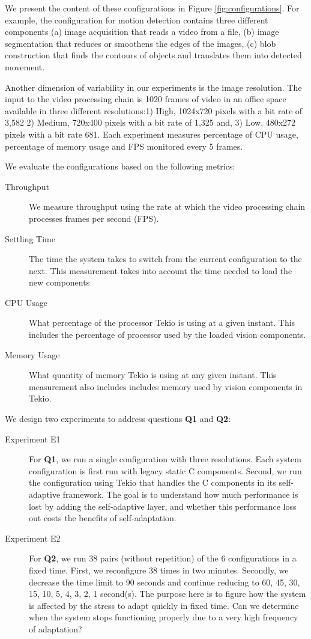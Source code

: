 \documentclass{acm_proc_article-sp}
\begin{document}
We present the content of these configurations in Figure \ref{fig:configurations}. For example, the configuration for motion detection contains three different components (a) image acquisition that reads a video from a file, (b) image segmentation that reduces or smoothens the edges of the images, (c) blob construction  that finds the contours of objects and translates them into detected movement. 

Another dimension of variability in our experiments is the image resolution. The input to the video processing chain is 1020 frames of video in an office space available in three different resolutions:1) High, 1024x720 pixels with a bit rate of 3,582 2) Medium, 720x400 pixels with a bit rate of 1,325 and, 3) Low, 480x272 pixels with a bit rate 681. Each experiment measures percentage of CPU usage, percentage of memory usage and FPS monitored every 5 frames. 

We evaluate the configurations based on the following metrics:
	\begin{description}
		\item[Throughput] We measure throughput using the rate at which the video processing chain processes frames per second (FPS).
		\item[Settling Time] The time the system takes to switch from the current configuration to the next. This measurement takes into account the time needed to load the new components
		\item[CPU Usage] What percentage of the processor Tekio is using at a given instant. This includes the percentage of processor used by the loaded vision components.
		\item[Memory Usage] What quantity of memory Tekio is using at any given instant. This measurement also includes includes memory used by vision components in Tekio.
	\end{description}

We design two experiments to address questions \textbf{Q1} and \textbf{Q2}:

\begin{description}	
		\item[Experiment E1] For \textbf{Q1}, we run a single configuration with three resolutions. Each system configuration is first run  with legacy static C components. Second, we run the configuration using  Tekio that handles the C components in its self-adaptive framework. The goal is to understand how much performance is lost by adding the self-adaptive layer, and whether this performance loss out costs the benefits of self-adaptation.
		
		\item[Experiment E2] For \textbf{Q2}, we run 38 pairs (without repetition) of the 6 configurations in a fixed time. First, we reconfigure 38 times in two minutes.	Secondly, we  decrease the time limit to 90 seconds and continue reducing to 60, 45, 30, 15, 10, 5, 4, 3, 2, 1 second(s). The purpose here is to figure how the system is affected by the stress to adapt quickly in fixed time. Can we determine when the system stops functioning properly due to a very high frequency of adaptation?
		
	\end{description}
	
\end{document}
